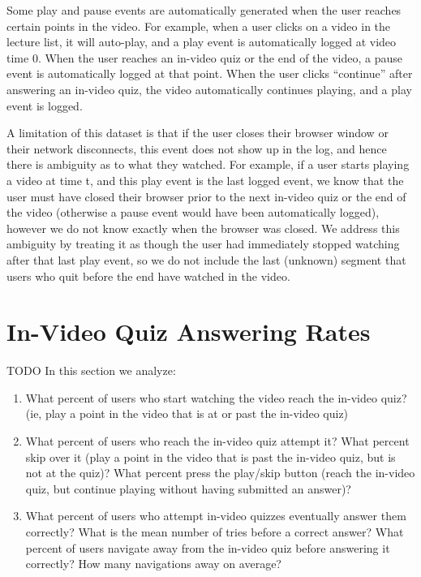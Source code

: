 \documentclass[letterpaper]{article}
\begin{document}
Some play and pause events are automatically generated when the user reaches certain points in the video. For example, when a user clicks on a video in the lecture list, it will auto-play, and a play event is automatically logged at video time 0. When the user reaches an in-video quiz or the end of the video, a pause event is automatically logged at that point. When the user clicks ``continue'' after answering an in-video quiz, the video automatically continues playing, and a play event is logged.

A limitation of this dataset is that if the user closes their browser window or their network disconnects, this event does not show up in the log, and hence there is ambiguity as to what they watched. For example, if a user starts playing a video at time t, and this play event is the last logged event, we know that the user must have closed their browser prior to the next in-video quiz or the end of the video (otherwise a pause event would have been automatically logged), however we do not know exactly when the browser was closed. We address this ambiguity by treating it as though the user had immediately stopped watching after that last play event, so we do not include the last (unknown) segment that users who quit before the end have watched in the video.


\section{In-Video Quiz Answering Rates}

TODO In this section we analyze:

\begin{enumerate}
\item What percent of users who start watching the video reach the in-video quiz? (ie, play a point in the video that is at or past the in-video quiz)
\item What percent of users who reach the in-video quiz attempt it? What percent skip over it (play a point in the video that is past the in-video quiz, but is not at the quiz)? What percent press the play/skip button (reach the in-video quiz, but continue playing without having submitted an answer)?
\item What percent of users who attempt in-video quizzes eventually answer them correctly? What is the mean number of tries before a correct answer? What percent of users navigate away from the in-video quiz before answering it correctly? How many navigations away on average?
\end{enumerate}
\end{document}
